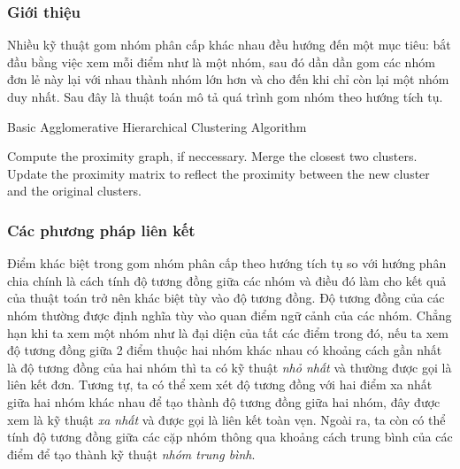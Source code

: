 \subsubsection{Giới thiệu}
Nhiều kỹ thuật gom nhóm phân cấp khác nhau đều hướng đến một mục tiêu: bắt đầu bằng việc xem mỗi điểm như là một nhóm, sau đó dần dần gom các nhóm đơn lẻ này lại với nhau thành nhóm lớn hơn và cho đến khi chỉ còn lại một nhóm duy nhất.
Sau đây là thuật toán mô tả quá trình gom nhóm theo hướng tích tụ.

\begin{algorithm}
\caption{Basic Agglomerative Hierarchical Clustering Algorithm}\label{agglomerative}
\begin{algorithmic}[1]
\State Compute the proximity graph, if neccessary.
\Repeat
\State Merge the closest two clusters.
\State Update the proximity matrix to reflect the proximity between the new cluster and the original clusters.
\end{algorithmic}
\end{algorithm}

		
%		

\subsubsection{Các phương pháp liên kết}
Điểm khác biệt trong gom nhóm phân cấp theo hướng tích tụ so với hướng phân chia chính là cách tính độ tương đồng giữa các nhóm và điều đó làm cho kết quả của thuật toán trở nên khác biệt tùy vào độ tương đồng.
Độ tương đồng của các nhóm thường được định nghĩa tùy vào quan điểm ngữ cảnh của các nhóm.
Chẳng hạn khi ta xem một nhóm như là đại diện của tất các điểm trong đó, nếu ta xem độ tương đồng giữa 2 điểm thuộc hai nhóm khác nhau có khoảng cách gần nhất là độ tương đồng của hai nhóm thì ta có kỹ thuật \textit{nhỏ nhất} và thường được gọi là liên kết đơn.
Tương tự, ta có thể xem xét độ tương đồng với hai điểm xa nhất giữa hai nhóm khác nhau để tạo thành độ tương đồng giữa hai nhóm, đây được xem là kỹ thuật \textit{xa nhất} và được gọi là liên kết toàn vẹn.
Ngoài ra, ta còn có thể tính độ tương đồng giữa các cặp nhóm thông qua khoảng cách trung bình của các điểm để tạo thành kỹ thuật \textit{nhóm trung bình}.

